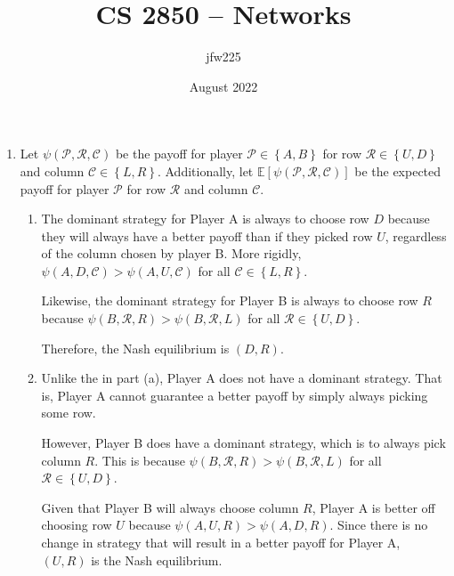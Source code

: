 \documentclass{article}
\title{CS 2850 -- Networks}
\author{jfw225 }
\date{August 2022}
\newcommand{\pay}[3]{\psi\left(#1,#2,#3\right)}
\newcommand{\expp}[1]{\mathbb{E}\left[ #1 \right]}
\begin{document}
\maketitle

\begin{enumerate}
    \item 
    Let $\pay{\mathcal{P}}{\mathcal{R}}{\mathcal{C}}$ be the payoff for player 
    $\mathcal{P}\in\left\{A,B\right\}$ for row $\mathcal{R}\in\left\{U,D\right\}$ 
    and column $\mathcal{C}\in\left\{L,R\right\}$. Additionally, let $\expp{\pay{\mathcal{P}}{\mathcal{R}}{\mathcal{C}}}$ be the expected payoff for player $\mathcal{P}$ for row $\mathcal{R}$ and column $\mathcal{C}$.
    
    \begin{enumerate}
        \item The dominant strategy for Player A is always to choose row $D$ 
        because they will always have a better payoff than if they picked row 
        $U$, regardless of the column chosen by player B. More rigidly, $\pay{A}{D}{\mathcal{C}}>\pay{A}{U}{\mathcal{C}}$ for all $\mathcal{C}\in\left\{L,R\right\}$.

        Likewise, the dominant strategy for Player B is always to choose row $R$ because $\pay{B}{\mathcal{R}}{R}>\pay{B}{\mathcal{R}}{L}$ for all $\mathcal{R}\in\left\{U,D\right\}$.

        Therefore, the Nash equilibrium is $(D,R)$.

        \item Unlike the in part (a), Player A does not have a dominant strategy. That is, Player A cannot guarantee a better payoff by simply always picking some row. 
        
        However, Player B does have a dominant strategy, which is to always pick column $R$. This is because $\pay{B}{\mathcal{R}}{R}>\pay{B}{\mathcal{R}}{L}$ for all $\mathcal{R}\in\left\{U,D\right\}$.

        Given that Player B will always choose column $R$, Player A is better off choosing row $U$ because $\pay{A}{U}{R}>\pay{A}{D}{R}$. Since there is no change in strategy that will result in a better payoff for Player A, $(U,R)$ is the Nash equilibrium.


\end{enumerate}
\end{enumerate}
\end{document}
